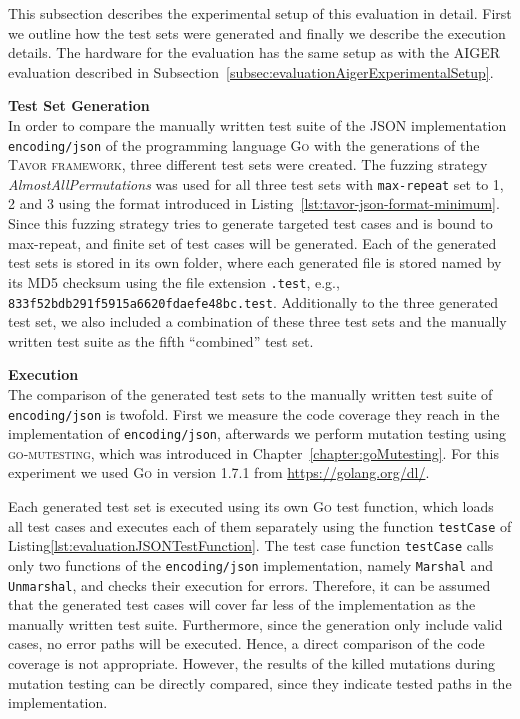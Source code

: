 This subsection describes the experimental setup of this evaluation in detail. First we outline how the test sets were generated and finally we describe the execution details. The hardware for the evaluation has the same setup as with the AIGER evaluation described in Subsection~\ref{subsec:evaluationAigerExperimentalSetup}.

\textbf{Test Set Generation}\\
In order to compare the manually written test suite of the JSON implementation \texttt{encoding/json} of the programming language \textsc{Go} with the generations of the \textsc{Tavor framework}, three different test sets were created. The fuzzing strategy \emph{AlmostAllPermutations} was used for all three test sets with \texttt{max-repeat} set to 1, 2 and 3 using the format introduced in Listing~\ref{lst:tavor-json-format-minimum}. Since this fuzzing strategy tries to generate targeted test cases and is bound to max-repeat, and finite set of test cases will be generated. Each of the generated test sets is stored in its own folder, where each generated file is stored named by its MD5 checksum using the file extension \texttt{.test}, e.g., \texttt{833f52bdb291f5915a6620fdaefe48bc.test}. Additionally to the three generated test set, we also included a combination of these three test sets and the manually written test suite as the fifth \enquote{combined} test set.

\textbf{Execution}\\
The comparison of the generated test sets to the manually written test suite of \texttt{encoding/json} is twofold. First we measure the code coverage they reach in the implementation of \texttt{encoding/json}, afterwards we perform mutation testing using \textsc{go-mutesting}, which was introduced in Chapter~\ref{chapter:goMutesting}. For this experiment we used \textsc{Go} in version 1.7.1 from \url{https://golang.org/dl/}.

Each generated test set is executed using its own \textsc{Go} test function, which loads all test cases and executes each of them separately using the function \texttt{testCase} of Listing\ref{lst:evaluationJSONTestFunction}. The test case function \texttt{testCase} calls only two functions of the \texttt{encoding/json} implementation, namely \texttt{Marshal} and \texttt{Unmarshal}, and checks their execution for errors. Therefore, it can be assumed that the generated test cases will cover far less of the implementation as the manually written test suite. Furthermore, since the generation only include valid cases, no error paths will be executed. Hence, a direct comparison of the code coverage is not appropriate. However, the results of the killed mutations during mutation testing can be directly compared, since they indicate tested paths in the implementation.

